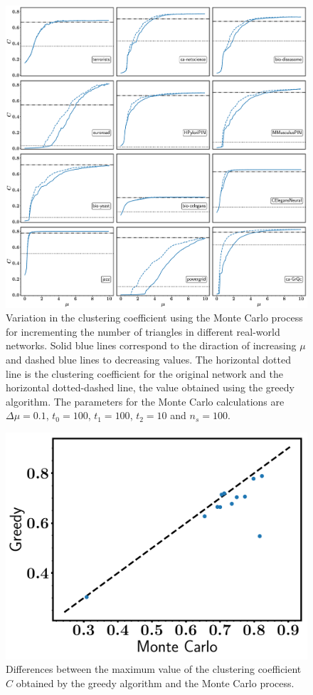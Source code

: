 \documentclass{article}
\begin{document}
\begin{figure}[ht!]
\centering
\includegraphics[scale=0.26]{./figs/Cmax_MC_and_greedy}
\caption{Variation in the clustering coefficient using the Monte Carlo process for incrementing the number of triangles in different real-world networks. Solid blue lines correspond to the diraction of increasing $\mu$ and dashed blue lines to decreasing values. The horizontal dotted line is the clustering coefficient for the original network and the horizontal dotted-dashed line, the value obtained using the greedy algorithm. The parameters for the Monte Carlo calculations are $\Delta \mu = 0.1$, $t_0 = 100$, $t_1 = 100$, $t_2 = 10$ and $n_s = 100$.}
\label{fig:Cmax_MC_and_greedy}
\end{figure}

\begin{figure}[ht!]
\centering
\includegraphics[scale=0.35]{./figs/Cmax_MC_vs_greedy}
\caption{Differences between the maximum value of the clustering coefficient $C$ obtained by the greedy algorithm and the Monte Carlo process.}
\label{fig:Cmax_MC_vs_greedy}
\end{figure}
\end{document}

